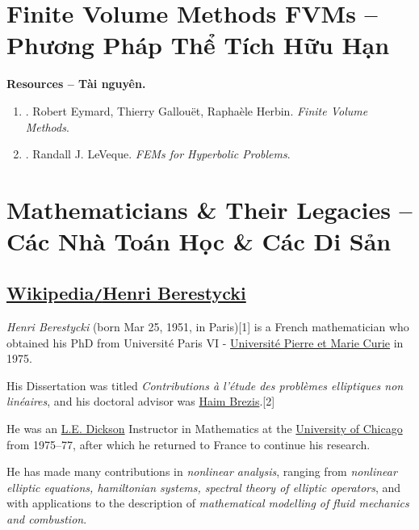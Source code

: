 \documentclass{article}
\begin{document}

\section{Finite Volume Methods FVMs -- Phương Pháp Thể Tích Hữu Hạn}
\textbf{\textsf{Resources -- Tài nguyên.}}
\begin{enumerate}
	\item \cite{Eymard_Gallouet_Herbin2019}. {\sc Robert Eymard, Thierry Gallou\"et, Rapha\`ele Herbin}. {\it Finite Volume Methods}.
	\item \cite{LeVeque2002}. {\sc Randall J. LeVeque}. {\it FEMs for Hyperbolic Problems}.
\end{enumerate}


\section{Mathematicians \& Their Legacies -- Các Nhà Toán Học \& Các Di Sản}


\subsection{\href{https://en.wikipedia.org/wiki/Henri_Berestycki}{Wikipedia\texttt{/}Henri Berestycki}}
\textit{Henri Berestycki} (born Mar 25, 1951, in Paris)[1] is a French mathematician who obtained his PhD from Université Paris VI - \href{https://en.wikipedia.org/wiki/Universit\%C3\%A9_Pierre_et_Marie_Curie}{Université Pierre et Marie Curie} in 1975.

His Dissertation was titled \textit{Contributions à l'étude des problèmes elliptiques non linéaires}, and his doctoral advisor was \href{https://en.wikipedia.org/wiki/Haim_Brezis}{Haim Brezis}.[2]

He was an \href{https://en.wikipedia.org/wiki/Leonard_Eugene_Dickson}{L.E. Dickson} Instructor in Mathematics at the \href{https://en.wikipedia.org/wiki/University_of_Chicago}{University of Chicago} from 1975--77, after which he returned to France to continue his research.

He has made many contributions in \textit{nonlinear analysis}, ranging from \textit{nonlinear elliptic equations, hamiltonian systems, spectral theory of elliptic operators}, and with applications to the description of \textit{mathematical modelling of fluid mechanics and combustion}.
\end{document}
